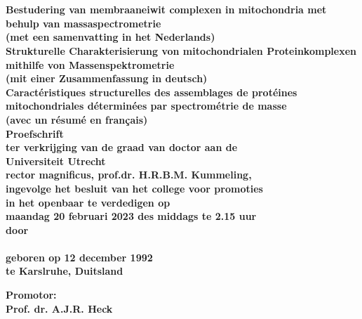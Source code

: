 \begin{titlepage}
	\begin{center}
		{\huge \bfseries \thesistitle \par \ }\\
		[0.5cm]
		{\small \bfseries Bestudering van membraaneiwit complexen in mitochondria met behulp van massaspectrometrie\\
		(met een samenvatting in het Nederlands)}\\
		[0.25cm]
		{\small \bfseries Strukturelle Charakterisierung von mitochondrialen Proteinkomplexen mithilfe von Massenspektrometrie\\
		(mit einer Zusammenfassung in deutsch)}\\
		[0.25cm]
		{\small \bfseries Caractéristiques structurelles des assemblages de protéines mitochondriales déterminées par spectrométrie de masse\\
		(avec un résumé en français)}\\
		[2cm]
		{\Large \bfseries Proefschrift}\\
		\bigskip
		\bigskip
		{\small \bfseries ter verkrijging van de graad van doctor aan de\\
			Universiteit Utrecht\\
			rector magnificus, prof.dr. H.R.B.M. Kummeling,\\
			ingevolge het besluit van het college voor promoties\\
			in het openbaar te verdedigen op\\
			\bigskip
			maandag 20 februari 2023 des middags te 2.15 uur}\\
		[1cm]
		{\small \bfseries door}\\
		[1cm]

		{\large \bfseries\name\\
		\smallskip
		\small geboren op 12 december 1992\\
		te Karslruhe, Duitsland}

	\end{center}

	\clearpage

	\begin{flushleft}
		{\bfseries Promotor:\\
			\small Prof. dr. A.J.R. Heck}
	\end{flushleft}

\end{titlepage}